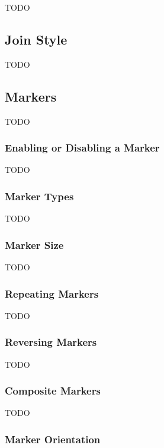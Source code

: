 TODO


\subsection{Join Style}\label{sec:joinstyle}

TODO


\subsection{Markers}\label{sec:markers}

TODO


\subsubsection{Enabling or Disabling a Marker}\label{sec:enablingmarkers}

TODO


\subsubsection{Marker Types}\label{sec:markertypes}

TODO


\subsubsection{Marker Size}\label{sec:markersize}

TODO


\subsubsection{Repeating Markers}\label{sec:repeatingmarkers}

TODO


\subsubsection{Reversing Markers}\label{sec:reversingmarkers}

TODO


\subsubsection{Composite Markers}\label{sec:compositemarkers}

TODO


\subsubsection{Marker Orientation}\label{sec:markerorientation}

